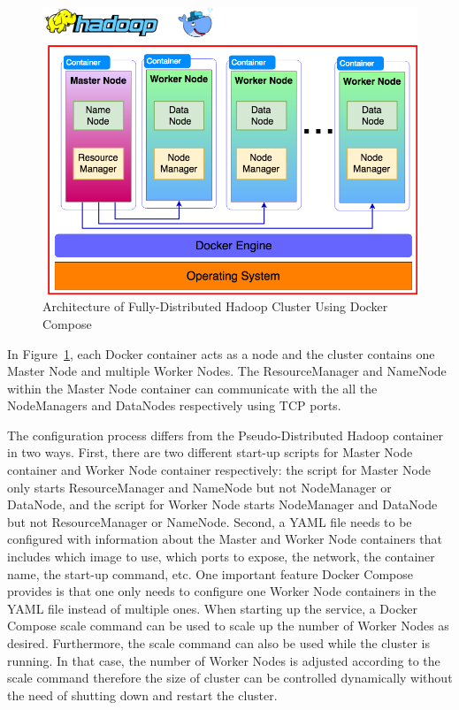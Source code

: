 \begin{figure}[!ht]
	\centering\includegraphics[width=\columnwidth]{images/hadoop-docker-compose.png}
	\caption{Architecture of Fully-Distributed 
		Hadoop Cluster Using Docker Compose}\label{f:hadoop-compose}
\end{figure}

In Figure~\ref{f:hadoop-compose}, each Docker container acts as a
node and the cluster contains one Master Node and multiple Worker
Nodes. The ResourceManager and NameNode within the Master Node
container can communicate with the all the NodeManagers and DataNodes
respectively using TCP ports.

The configuration process differs from the Pseudo-Distributed Hadoop
container in two ways. First, there are two different start-up scripts
for Master Node container and Worker Node container respectively: the
script for Master Node only starts ResourceManager and NameNode but
not NodeManager or DataNode, and the script for Worker Node starts
NodeManager and DataNode but not ResourceManager or NameNode. Second,
a YAML file needs to be configured with information about the Master
and Worker Node containers that includes which image to use, which
ports to expose, the network, the container name, the start-up
command, etc. One important feature Docker Compose provides is that
one only needs to configure one Worker Node containers in the YAML
file instead of multiple ones. When starting up the service, a Docker
Compose scale command can be used to scale up the number of Worker
Nodes as desired. Furthermore, the scale command can also be used
while the cluster is running. In that case, the number of Worker Nodes
is adjusted according to the scale command therefore the size of
cluster can be controlled dynamically without the need of shutting
down and restart the cluster.

